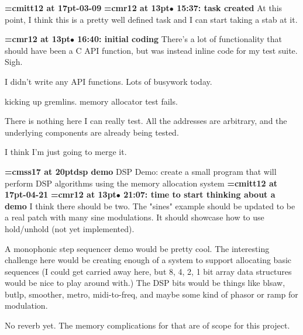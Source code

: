 {\medskip\noindent\bf\font\titlefont=cmitt12 at 17pt-03-09}\medskip
{\smallskip\noindent\bf\font\titlefont=cmr12 at 13pt\titlefont $\bullet$ 15:37: task created}\smallskip
At this point, I think this is a pretty well defined task and I can start taking a stab at it.
\par

{\smallskip\noindent\bf\font\titlefont=cmr12 at 13pt\titlefont $\bullet$ 16:40: initial coding}\smallskip
There's a lot of functionality that should have been a C API function, but was instead inline code for my test suite. Sigh.
\par

I didn't write any API functions. Lots of busywork today.
\par

kicking up gremlins. memory allocator test fails.
\par

There is nothing here I can really test. All the addresses are arbitrary, and the underlying components are already being tested.
\par

I think I'm just going to merge it.
\par

{\medskip\noindent\bf\font\titlefont=cmss17 at 20pt\titlefont dsp demo}\medskip
DSP Demo: create a small program that will perform DSP algorithms
using the memory allocation system
{\medskip\noindent\bf\font\titlefont=cmitt12 at 17pt-04-21}\medskip
{\smallskip\noindent\bf\font\titlefont=cmr12 at 13pt\titlefont $\bullet$ 21:07: time to start thinking about a demo}\smallskip
I think there should be two. The "sines" example should be updated to be a real patch with many sine modulations. It should showcase how to use hold/unhold (not yet implemented).
\par

A monophonic step sequencer demo would be pretty cool. The interesting challenge here would be creating enough of a system to support allocating basic sequences (I could get carried away here, but 8, 4, 2, 1 bit array data structures would be nice to play around with.) The DSP bits would be things like blsaw, butlp, smoother, metro, midi-to-freq, and maybe some kind of phasor or ramp for modulation.
\par

No reverb yet. The memory complications for that are of scope for this project.
\par

